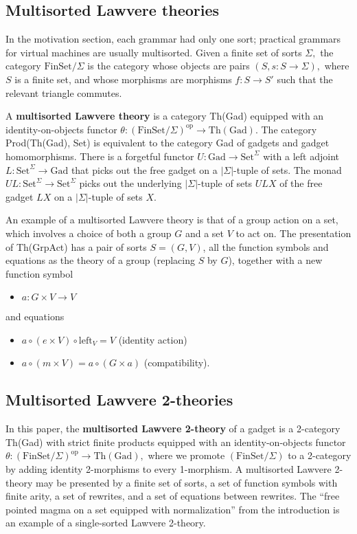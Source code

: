 \documentclass{article}
\newcommand{\maps}{\colon}
\newcommand{\FinSet}{\mathrm{FinSet}}
\newcommand{\Set}{\mathrm{Set}}
\newcommand{\Gad}{\mathrm{Gad}}
\newcommand{\op}{\mathrm{op}}
\begin{document}
\subsection{Multisorted Lawvere theories}
In the motivation section, each grammar had only one sort; practical grammars for virtual machines are usually multisorted.  Given a finite set of sorts $\Sigma,$ the category $\FinSet/\Sigma$ is the category whose objects are pairs $(S, s\maps S\to \Sigma),$ where $S$ is a finite set, and whose morphisms are morphisms $f\maps S \to S'$ such that the relevant triangle commutes.

A {\bf multisorted Lawvere theory} is a category Th(Gad) equipped with an identity-on-objects functor ${\theta\maps (\FinSet/\Sigma)^\op \to \mathrm{Th(Gad)}.}$  The category Prod(\allowbreak Th(Gad), Set) is equivalent to the category Gad of gadgets and gadget homomorphisms.  There is a forgetful functor ${U\maps \Gad \to \Set^\Sigma}$ with a left adjoint ${L\maps \Set^\Sigma \to \Gad}$ that picks out the free gadget on a $|\Sigma|$-tuple of sets.  The monad ${UL\maps \Set^\Sigma \to \Set^\Sigma}$ picks out the underlying $|\Sigma|$-tuple of sets $ULX$ of the free gadget $LX$ on a $|\Sigma|$-tuple of sets $X$.

An example of a multisorted Lawvere theory is that of a group action on a set, which involves a choice of both a group $G$ and a set $V$ to act on.  The presentation of Th(GrpAct) has a pair of sorts $S = (G, V)$, all the function symbols and equations as the theory of a group (replacing $S$ by $G$), together with a new function symbol
\begin{itemize}
  \item $a\maps G \times V \to V$
\end{itemize}
and equations
\begin{itemize}
  \item $a \circ (e \times V) \circ \mathrm{left}_V = V$ (identity action)
  \item $a \circ (m \times V) = a \circ (G \times a)$ (compatibility).
\end{itemize}

\subsection {Multisorted Lawvere 2-theories}
In this paper, the {\bf multisorted Lawvere 2-theory} of a gadget is a 2-category Th(Gad) with strict finite products equipped with an identity-on-objects functor $\theta\maps (\FinSet/\Sigma)^\op \to \mathrm{Th(Gad)},$ where we promote $(\FinSet/\Sigma)$ to a 2-category by adding identity 2-morphisms to every 1-morphism.  A multisorted Lawvere 2-theory may be presented by a finite set of sorts, a set of function symbols with finite arity, a set of rewrites, and a set of equations between rewrites.  The ``free pointed magma on a set equipped with normalization'' from the introduction is an example of a single-sorted Lawvere 2-theory.  
\end{document}

